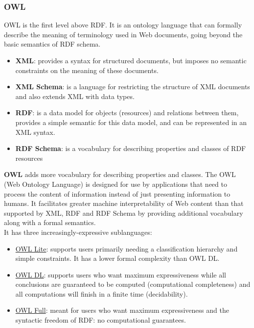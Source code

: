 \documentclass[10pt,a4paper]{article}
\begin{document}
\begin{justify}
\subsubsection{OWL}
OWL is the first level above RDF. It is an ontology language that can formally describe the meaning of terminology used in Web documents, going beyond the basic semantics of RDF schema.
\begin{itemize}
	\item \textbf{XML}: provides a syntax for structured documents, but imposes no semantic constraints on the meaning of these documents.
	\item \textbf{XML Schema}: is a language for restricting the structure of XML documents and also extends XML with data types.
	\item \textbf{RDF}: is a data model for objects (resources) and relations between them, provides a simple semantic for this data model, and can be represented in an XML syntax.
	\item \textbf{RDF Schema}: is a vocabulary for describing properties and classes of RDF resources
\end{itemize}
\textbf{OWL} adds more vocabulary for describing properties and classes. The OWL (Web Ontology Language) is designed for use by applications that need to process the content of information instead of just presenting information to humans. It facilitates greater machine interpretability of Web content than that supported by XML, RDF and RDF Schema by providing additional vocabulary along with a formal semantics.\\
	It has three increasingly-expressive sublanguages:
	\begin{itemize}
		\item \uline{OWL Lite}: supports users primarily needing a classification hierarchy and simple constraints. It has a lower formal complexity than OWL DL.
		\item \uline{OWL DL}: supports users who want maximum expressiveness while all conclusions are guaranteed to be computed (computational completeness) and all computations will finish in a finite time (decidability).
		\item \uline{OWL Full}: meant for users who want maximum expressiveness and the syntactic freedom of RDF: no computational guarantees.
	\end{itemize}

\end{justify}
\end{document}
